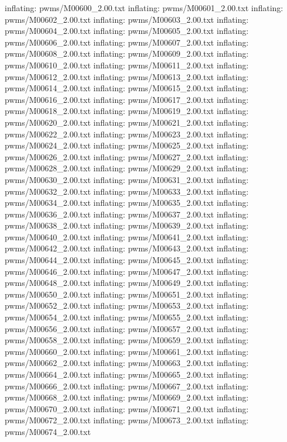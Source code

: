 \documentclass[letterpaper,10pt,english]{sphinxmanual}
\begin{document}
{\begin{sphinxVerbatim}[commandchars=\\\{\}]
  inflating: pwms/M00600\_2.00.txt
  inflating: pwms/M00601\_2.00.txt
  inflating: pwms/M00602\_2.00.txt
  inflating: pwms/M00603\_2.00.txt
  inflating: pwms/M00604\_2.00.txt
  inflating: pwms/M00605\_2.00.txt
  inflating: pwms/M00606\_2.00.txt
  inflating: pwms/M00607\_2.00.txt
  inflating: pwms/M00608\_2.00.txt
  inflating: pwms/M00609\_2.00.txt
  inflating: pwms/M00610\_2.00.txt
  inflating: pwms/M00611\_2.00.txt
  inflating: pwms/M00612\_2.00.txt
  inflating: pwms/M00613\_2.00.txt
  inflating: pwms/M00614\_2.00.txt
  inflating: pwms/M00615\_2.00.txt
  inflating: pwms/M00616\_2.00.txt
  inflating: pwms/M00617\_2.00.txt
  inflating: pwms/M00618\_2.00.txt
  inflating: pwms/M00619\_2.00.txt
  inflating: pwms/M00620\_2.00.txt
  inflating: pwms/M00621\_2.00.txt
  inflating: pwms/M00622\_2.00.txt
  inflating: pwms/M00623\_2.00.txt
  inflating: pwms/M00624\_2.00.txt
  inflating: pwms/M00625\_2.00.txt
  inflating: pwms/M00626\_2.00.txt
  inflating: pwms/M00627\_2.00.txt
  inflating: pwms/M00628\_2.00.txt
  inflating: pwms/M00629\_2.00.txt
  inflating: pwms/M00630\_2.00.txt
  inflating: pwms/M00631\_2.00.txt
  inflating: pwms/M00632\_2.00.txt
  inflating: pwms/M00633\_2.00.txt
  inflating: pwms/M00634\_2.00.txt
  inflating: pwms/M00635\_2.00.txt
  inflating: pwms/M00636\_2.00.txt
  inflating: pwms/M00637\_2.00.txt
  inflating: pwms/M00638\_2.00.txt
  inflating: pwms/M00639\_2.00.txt
  inflating: pwms/M00640\_2.00.txt
  inflating: pwms/M00641\_2.00.txt
  inflating: pwms/M00642\_2.00.txt
  inflating: pwms/M00643\_2.00.txt
  inflating: pwms/M00644\_2.00.txt
  inflating: pwms/M00645\_2.00.txt
  inflating: pwms/M00646\_2.00.txt
  inflating: pwms/M00647\_2.00.txt
  inflating: pwms/M00648\_2.00.txt
  inflating: pwms/M00649\_2.00.txt
  inflating: pwms/M00650\_2.00.txt
  inflating: pwms/M00651\_2.00.txt
  inflating: pwms/M00652\_2.00.txt
  inflating: pwms/M00653\_2.00.txt
  inflating: pwms/M00654\_2.00.txt
  inflating: pwms/M00655\_2.00.txt
  inflating: pwms/M00656\_2.00.txt
  inflating: pwms/M00657\_2.00.txt
  inflating: pwms/M00658\_2.00.txt
  inflating: pwms/M00659\_2.00.txt
  inflating: pwms/M00660\_2.00.txt
  inflating: pwms/M00661\_2.00.txt
  inflating: pwms/M00662\_2.00.txt
  inflating: pwms/M00663\_2.00.txt
  inflating: pwms/M00664\_2.00.txt
  inflating: pwms/M00665\_2.00.txt
  inflating: pwms/M00666\_2.00.txt
  inflating: pwms/M00667\_2.00.txt
  inflating: pwms/M00668\_2.00.txt
  inflating: pwms/M00669\_2.00.txt
  inflating: pwms/M00670\_2.00.txt
  inflating: pwms/M00671\_2.00.txt
  inflating: pwms/M00672\_2.00.txt
  inflating: pwms/M00673\_2.00.txt
  inflating: pwms/M00674\_2.00.txt

\end{sphinxVerbatim}}
\end{document}
